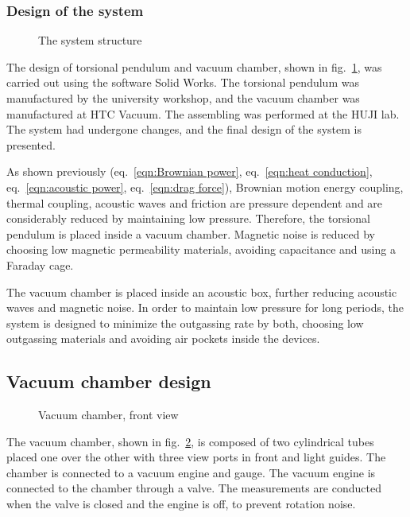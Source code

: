 \documentclass[\main/master.tex]{subfiles}
\begin{document}
\subsubsection{Design of the system}
\begin{figure}[htbp]
	\centering
	\caption[Total chamber]{The system structure}
	\label{fig:Total chamber}
\end{figure}
\FloatBarrier
\par\noindent
The design of torsional pendulum and vacuum chamber, shown in fig.~\ref{fig:Total chamber}, was carried out using the software Solid Works. The torsional pendulum was manufactured by the university workshop, and the vacuum chamber was manufactured at HTC Vacuum. The assembling was performed at the HUJI lab. The system had undergone changes, and the final design of the system is presented. 
\par\noindent
As shown previously (eq.~\ref{eqn:Brownian power}, eq.~\ref{eqn:heat conduction}, eq.~\ref{eqn:acoustic power}, eq.~\ref{eqn:drag force}), Brownian motion energy coupling, thermal coupling, acoustic waves and friction are pressure dependent and are considerably reduced by maintaining low pressure. Therefore, the torsional pendulum is placed inside a vacuum chamber. Magnetic noise is reduced by choosing low magnetic permeability materials, avoiding capacitance and using a Faraday cage. 
\par\noindent
The vacuum chamber is placed inside an acoustic box, further reducing acoustic waves and magnetic noise. In order to maintain low pressure for long periods, the system is designed to minimize the outgassing rate by both, choosing low outgassing materials and avoiding air pockets inside the devices. 
\subsection{Vacuum chamber design}
\begin{figure}[htbp]
	\centering
	\caption[Vacuum chamber, front view]{Vacuum chamber, front view}
	\label{fig:chamber front}
\end{figure}
\FloatBarrier

\par\noindent
The vacuum chamber, shown in fig.~\ref{fig:chamber front}, is composed of two cylindrical tubes placed one over the other with three view ports in front and light guides. The chamber is connected to a vacuum engine and gauge. The vacuum engine is connected to the chamber through a valve. The measurements are conducted when the valve is closed and the engine is off, to prevent rotation noise.
\end{document}
